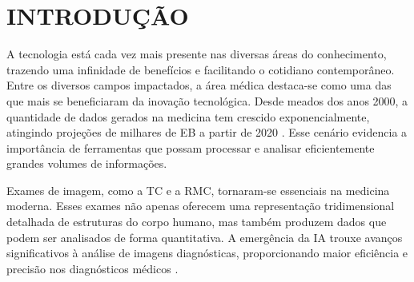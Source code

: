 \chapter{INTRODUÇÃO}
\label{chap:intro}

A tecnologia está cada vez mais presente nas diversas áreas do conhecimento, trazendo uma infinidade de benefícios e facilitando o cotidiano contemporâneo. Entre os diversos campos impactados, a área médica destaca-se como uma das que mais se beneficiaram da inovação tecnológica. Desde meados dos anos 2000, a quantidade de dados gerados na medicina tem crescido exponencialmente, atingindo projeções de milhares de \gls{EB} a partir de 2020 \cite{gantzDIGITALUNIVERSE2020}. Esse cenário evidencia a importância de ferramentas que possam processar e analisar eficientemente grandes volumes de informações.


Exames de imagem, como a \gls{TC} e a \gls{RMC}, tornaram-se essenciais na medicina moderna. Esses exames não apenas oferecem uma representação tridimensional detalhada de estruturas do corpo humano, mas também produzem dados que podem ser analisados de forma quantitativa. A emergência da \gls{IA} trouxe avanços significativos à análise de imagens diagnósticas, proporcionando maior eficiência e precisão nos diagnósticos médicos \cite{argentieroApplicationsArtificialIntelligence2022}.



